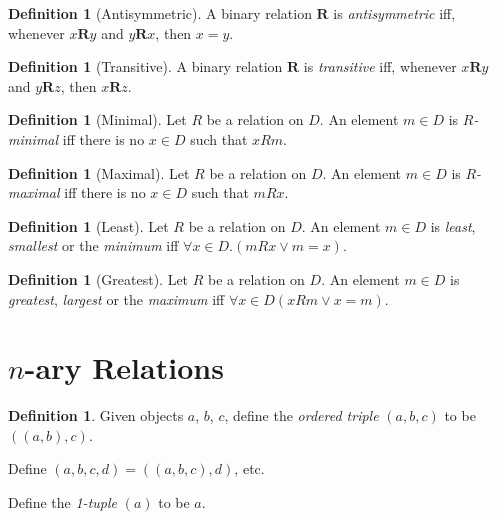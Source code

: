 \documentclass{report}
\theoremstyle{definition}
\newtheorem{definition}[axiom]{Definition}
\begin{document}
    \begin{definition}[Antisymmetric]
        A binary relation $\mathbf{R}$ is \emph{antisymmetric} iff, whenever $x\mathbf{R}y$ and
        $y \mathbf{R} x$, then $x = y$.
    \end{definition}

    \begin{definition}[Transitive]
        A binary relation $\mathbf{R}$ is \emph{transitive} iff, whenever $x\mathbf{R}y$ and $y\mathbf{R}z$,
        then $x\mathbf{R}z$.
    \end{definition}

    \begin{definition}[Minimal]
        Let $R$ be a relation on $D$. An element $m \in D$ is \emph{$R$-minimal} iff there is no
        $x \in D$ such that $x R m$.
    \end{definition}

    \begin{definition}[Maximal]
        Let $R$ be a relation on $D$. An element $m \in D$ is \emph{$R$-maximal} iff there is no
        $x \in D$ such that $mRx$.
    \end{definition}

    \begin{definition}[Least]
        Let $R$ be a relation on $D$. An element $m \in D$ is \emph{least}, \emph{smallest} or the
        \emph{minimum} iff $\forall x \in D. (m R x \vee m = x)$.
    \end{definition}

    \begin{definition}[Greatest]
        Let $R$ be a relation on $D$. An element $m \in D$ is \emph{greatest}, \emph{largest} or the
        \emph{maximum} iff $\forall x \in D (xRm \vee x = m)$.
    \end{definition}


    \section{$n$-ary Relations}

    \begin{definition}
        Given objects $a$, $b$, $c$, define the \emph{ordered triple}
        $(a,b,c)$ to be $((a,b),c)$.

        Define $(a,b,c,d) = ((a,b,c),d)$, etc.

        Define the \emph{1-tuple} $(a)$ to be $a$.
    \end{definition}
\end{document}
